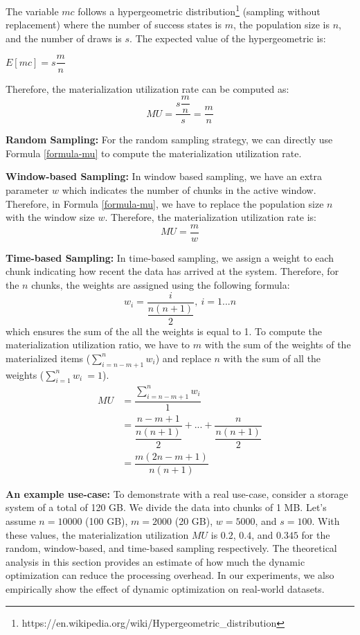The variable $mc$ follows a hypergeometric distribution\footnote{https://en.wikipedia.org/wiki/Hypergeometric\_distribution} (sampling without replacement) where the number of success states is $m$, the population size is $n$, and the number of draws is $s$.
The expected value of the hypergeometric is:
\begin{center}
$E[mc] = s\dfrac{m}{n}$
\end{center}
Therefore, the materialization utilization rate can be computed as: 
\begin{equation} \label{formula-mu}
MU = \dfrac{s\dfrac{m}{n}}{s} = \frac{m}{n}
\end{equation}

\textbf{Random Sampling:} 
For the random sampling strategy, we can directly use Formula \ref{formula-mu} to compute the materialization utilization rate.

\textbf{Window-based Sampling:}
In window based sampling, we have an extra parameter $w$ which indicates the number of chunks in the active window.
Therefore, in Formula \ref{formula-mu}, we have to replace the population size $n$ with the window size $w$.
Therefore, the materialization utilization rate is: 
\begin{equation}
MU = \dfrac{m}{w}
\end{equation}

\textbf{Time-based Sampling:}
In time-based sampling, we assign a weight to each chunk indicating how recent the data has arrived at the system.
Therefore, for the $n$ chunks, the weights are assigned using the following formula:
\begin{equation} \label{formula-weight}
w_i = \dfrac{i}{\dfrac{n(n+1)}{2}}, \ i = 1 ... n
\end{equation}
which ensures the sum of the all the weights is equal to 1.
To compute the materialization utilization ratio, we have to $m$ with the sum of the weights of the materialized items ($\sum_{i=n-m+1}^{n} w_i$) and replace $n$ with the sum of all the weights ($\sum_{i=1}^{n} w_i\ = 1$).
\begin{equation}
\begin{aligned}
MU &= \dfrac{\sum_{i=n-m+1}^{n} w_i}{1}\\
&=\dfrac{n-m+1}{\dfrac{n(n+1)}{2}} + ... + \dfrac{n}{\dfrac{n(n+1)}{2}} \\
&= \dfrac{m(2n-m+1)}{n(n+1)}
\end{aligned}
\end{equation}

\textbf{An example use-case:}
To demonstrate with a real use-case, consider a storage system of a total of 120 GB.
We divide the data into chunks of 1 MB. 
Let's assume $n=10000$ (100 GB), $m=2000$ (20 GB), $w=5000$, and $s=100$.
With these values, the materialization utilization $MU$ is $0.2$, $0.4$, and $0.345$ for the random, window-based, and time-based sampling respectively.
The theoretical analysis in this section provides an estimate of how much the dynamic optimization can reduce the processing overhead.
In our experiments, we also empirically show the effect of dynamic optimization on real-world datasets.

